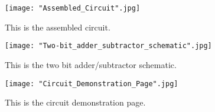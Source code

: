 \documentclass[11pt]{article}
\begin{document}
\begin{figure}[ht]\centering
	\texttt{[image: "Assembled\_Circuit".jpg]}
	\caption{This is the assembled circuit.}
	\label{fig:circuit_demonstration}			%
\end{figure}

\begin{figure}[ht]\centering
	\texttt{[image: "Two-bit\_adder\_subtractor\_schematic".jpg]}
	\caption{This is the two bit adder/subtractor schematic.}
	\label{fig:half_adder}			%
\end{figure}

\begin{figure}[ht]\centering
	\texttt{[image: "Circuit\_Demonstration\_Page".jpg]}
	\caption{This is the circuit demonstration page.}
	\label{fig:full_adder}			%
\end{figure}
\end{document}
